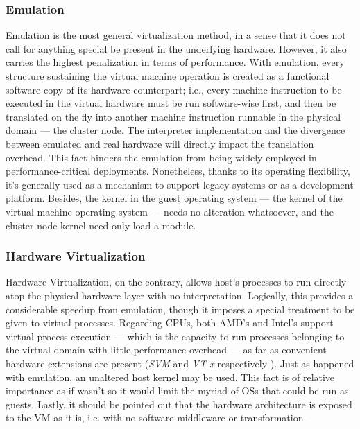 \subsubsection{Emulation}\label{subsubsec:emulacion}
\noindent Emulation is the most general virtualization method, in a sense that it does not call for anything special be present in the underlying hardware. However, it also carries the highest penalization in terms of performance. With emulation, every structure sustaining the virtual machine operation is created as a functional software copy of its hardware counterpart; i.e., every machine instruction to be executed in the virtual hardware must be run software-wise first, and then be translated on the fly into another machine instruction runnable in the physical domain --- the cluster node. The interpreter implementation and the divergence between emulated and real hardware will directly impact the translation overhead. This fact hinders the emulation from being widely employed in performance-critical deployments. Nonetheless, thanks to its operating flexibility, it's generally used as a mechanism to support legacy systems or as a development platform. Besides, the kernel in the guest operating system --- the kernel of the virtual machine operating system --- needs no alteration whatsoever, and the cluster node kernel need only load a module.

\subsubsection{Hardware Virtualization}\label{subsubsec:virthardware}
\noindent Hardware Virtualization, on the contrary, allows host's processes to run directly atop the physical hardware layer with no interpretation. Logically, this provides a considerable speedup from emulation, though it imposes a special treatment to be given to virtual processes. Regarding CPUs, both AMD's and Intel's support virtual process execution --- which is the capacity to run processes belonging to the virtual domain with little performance overhead --- as far as convenient hardware extensions are present (\emph{SVM} and \emph{VT-x} respectively \cite{intelvtx}). Just as happened with emulation, an unaltered host kernel may be used. This fact is of relative importance as if wasn't so it would limit the myriad of OSs that could be run as guests. Lastly, it should be pointed out that the hardware architecture is exposed to the VM as it is, i.e. with no software middleware or transformation.

